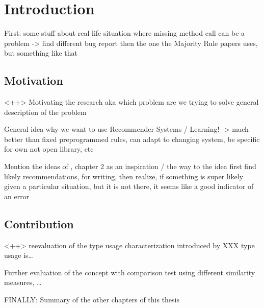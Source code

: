 \chapter{Introduction}\label{chapter:introduction}

First: some stuff about real life situation where missing method call can be a problem
-> find different bug report then the one the Majority Rule papers uses, but something like that
  
\section{Motivation}<++>
Motivating the research aka which problem are we trying to solve
general description of the problem

General idea why we want to use Recommender Systems / Learning!
-> much better than fixed preprogrammed rules, can adapt to changing system, be specific for own not open library, etc

Mention the ideas of \cite{bruch2012ide}, chapter 2 as an inspiration / the way to the idea
first find likely recommendations, for writing, then realize, if something is super likely given a particular situation, but it is not there, it seems like a good indicator of an error

\section{Contribution}<++>
reevaluation of the type usage characterization introduced by XXX
type usage is\ldots

Further evaluation of the concept with comparison test using different similarity measures, \ldots

FINALLY: Summary of the other chapters of this thesis
